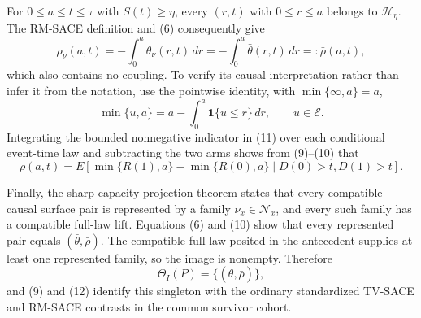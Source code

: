 For \(0\leq a\leq t\leq\tau\) with \(S(t)\geq\eta\), every \((r,t)\) with \(0\leq r\leq a\) belongs to \(\mathcal H_\eta\).  The RM-SACE definition and (6) consequently give
\[
\rho_\nu(a,t)
=-\int_0^a\theta_\nu(r,t)\,dr
=-\int_0^a\bar\theta(r,t)\,dr
=:\bar\rho(a,t), \tag{10}
\]
which also contains no coupling.  To verify its causal interpretation rather than infer it from the notation, use the pointwise identity, with \(\min\{\infty,a\}=a\),
\[
\min\{u,a\}=a-\int_0^a\mathbf 1\{u\leq r\}\,dr,
\qquad u\in\mathcal E. \tag{11}
\]
Integrating the bounded nonnegative indicator in (11) over each conditional event-time law and subtracting the two arms shows from (9)--(10) that
\[
\bar\rho(a,t)
=E\!\left[\min\{R(1),a\}-\min\{R(0),a\}
\mid D(0)>t,D(1)>t\right]. \tag{12}
\]

Finally, the sharp capacity-projection theorem states that every compatible causal surface pair is represented by a family \(\nu_x\in\mathcal N_x\), and every such family has a compatible full-law lift.  Equations (6) and (10) show that every represented pair equals \((\bar\theta,\bar\rho)\).  The compatible full law posited in the antecedent supplies at least one represented family, so the image is nonempty.  Therefore
\[
\Theta_I(P)=\{(\bar\theta,\bar\rho)\},
\]
and (9) and (12) identify this singleton with the ordinary standardized TV-SACE and RM-SACE contrasts in the common survivor cohort.
